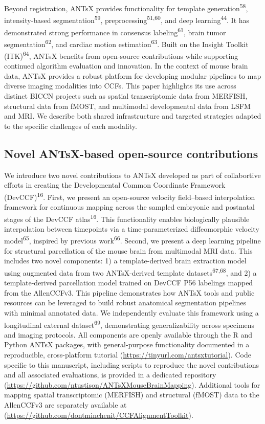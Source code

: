 \documentclass[
  12pt,
]{article}
\begin{document}
Beyond registration, ANTsX provides functionality for template
generation\textsuperscript{58}, intensity-based
segmentation\textsuperscript{59}, preprocessing\textsuperscript{51,60},
and deep learning\textsuperscript{44}. It has demonstrated strong
performance in consensus labeling\textsuperscript{61}, brain tumor
segmentation\textsuperscript{62}, and cardiac motion
estimation\textsuperscript{63}. Built on the Insight Toolkit
(ITK)\textsuperscript{64}, ANTsX benefits from open-source contributions
while supporting continued algorithm evaluation and innovation. In the
context of mouse brain data, ANTsX provides a robust platform for
developing modular pipelines to map diverse imaging modalities into
CCFs. This paper highlights its use across distinct BICCN projects such
as spatial transcriptomic data from MERFISH, structural data from fMOST,
and multimodal developmental data from LSFM and MRI. We describe both
shared infrastructure and targeted strategies adapted to the specific
challenges of each modality.

\subsection{Novel ANTsX-based open-source
contributions}\label{novel-antsx-based-open-source-contributions}

We introduce two novel contributions to ANTsX developed as part of
collabortive efforts in creating the Developmental Common Coordinate
Framework (DevCCF)\textsuperscript{16}. First, we present an open-source
velocity field--based interpolation framework for continuous mapping
across the sampled embryonic and postnatal stages of the DevCCF
atlas\textsuperscript{16}. This functionality enables biologically
plausible interpolation between timepoints via a time-parameterized
diffeomorphic velocity model\textsuperscript{65}, inspired by previous
work\textsuperscript{66}. Second, we present a deep learning pipeline
for structural parcellation of the mouse brain from multimodal MRI data.
This includes two novel components: 1) a template-derived brain
extraction model using augmented data from two ANTsX-derived template
datasets\textsuperscript{67,68}, and 2) a template-derived parcellation
model trained on DevCCF P56 labelings mapped from the AllenCCFv3. This
pipeline demonstrates how ANTsX tools and public resources can be
leveraged to build robust anatomical segmentation pipelines with minimal
annotated data. We independently evaluate this framework using a
longitudinal external dataset\textsuperscript{69}, demonstrating
generalizability across specimens and imaging protocols. All components
are openly available through the R and Python ANTsX packages, with
general-purpose functionality documented in a reproducible,
cross-platform tutorial (\url{https://tinyurl.com/antsxtutorial}). Code
specific to this manuscript, including scripts to reproduce the novel
contributions and all associated evaluations, is provided in a dedicated
repository (\url{https://github.com/ntustison/ANTsXMouseBrainMapping}).
Additional tools for mapping spatial transcriptomic (MERFISH) and
structural (fMOST) data to the AllenCCFv3 are separately available at
(\url{https://github.com/dontminchenit/CCFAlignmentToolkit}).
\end{document}
